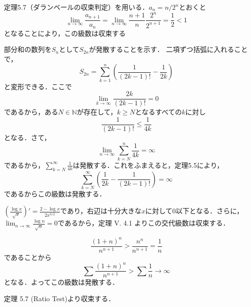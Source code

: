 

\begin{tanswer}
    定理5.7（ダランベールの収束判定）を用いる．$a_n=n/2^n$とおくと
    \[
        \lim_{n \to \infty}\frac{a_{n+1}}{a_n}=\lim_{n \to \infty}\frac{n+1}{n}\frac{2^n}{2^{n+1}}=\frac{1}{2}<1
    \]
    となることにより，この級数は収束する
\end{tanswer}


\begin{tanswer}
    部分和の数列を$S_{n}$として$S_{2n}$が発散することを示す． 二項ずつ括弧に入れることで，
    \[
        S_{2n} = \sum ^{n}_{k=1} \left (\frac{1}{(2k-1)!} - \frac{1}{2k} \right )
    \]
    と変形できる．ここで
    \[
        \lim_{k \to \infty} \frac{2k}{(2k-1)!} = 0
    \]
    であるから，ある$N \in \mathbb{N}$が存在して，$k \geq N$となるすべての$k$に対し
    \[
        \frac{1}{(2k-1)!} \leq \frac{1}{4k}
    \]
    となる．さて，
    \[
        \lim_{n \to \infty} \sum ^{n}_{k=N} \frac{1}{4k} = \infty
    \]
    であるから，$\sum ^{\infty}_{k=N} \frac{1}{4k}$は発散する．これをふまえると，定理5.5により，
    \[
        \sum^{\infty}_{k=N} \left (\frac{1}{2k} - \frac{1}{(2k-1)!}\right) =\infty
    \]
    であるからこの級数は発散する．
\end{tanswer}



\begin{tanswer}
    $\left (\frac{\log x}{\sqrt x}\right)' = \frac{2-\log x}{2x^{3/2}}$であり，右辺は十分大きな$x$に対して$0$以下となる．さらに，$\lim _{n \to \infty} \frac{\log n}{\sqrt n} = 0$であるから，定理 V. 4.1 よりこの交代級数は収束する．
\end{tanswer}


\begin{tanswer}
    \[
        \frac{(1+n)^n}{n^{n+1}}>\frac{n^n}{n^{n+1}}=\frac{1}{n}
    \]
    であることから
    \[
        \sum \frac{(1+n)^n}{n^{n+1}}>\sum \frac{1}{n} \rightarrow \infty
    \]
    となる．よってこの級数は発散する．
\end{tanswer}




\begin{tanswer}
    定理 5.7 (Ratio Test)より収束する．
\end{tanswer}


